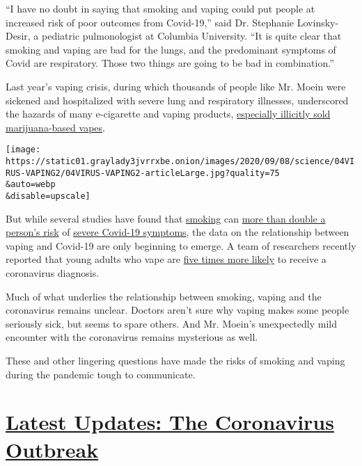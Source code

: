 ``I have no doubt in saying that smoking and vaping could put people at
increased risk of poor outcomes from Covid-19,'' said Dr. Stephanie
Lovinsky-Desir, a pediatric pulmonologist at Columbia University. ``It
is quite clear that smoking and vaping are bad for the lungs, and the
predominant symptoms of Covid are respiratory. Those two things are
going to be bad in combination.''

Last year's vaping crisis, during which thousands of people like Mr.
Moein were sickened and hospitalized with severe lung and respiratory
illnesses, underscored the hazards of many e-cigarette and vaping
products,
\href{https://www.nytimes3xbfgragh.onion/2019/11/08/health/vaping-illness-cdc.html}{especially
illicitly sold marijuana-based vapes}.

\texttt{[image: https://static01.graylady3jvrrxbe.onion/images/2020/09/08/science/04VIRUS-VAPING2/04VIRUS-VAPING2-articleLarge.jpg?quality=75\\\&auto=webp\\\&disable=upscale]}

But while several studies have found that
\href{https://www.nejm.org/doi/full/10.1056/NEJMoa2002032}{smoking} can
\href{https://academic.oup.com/ntr/article/22/9/1653/5835834}{more than
double a person's risk} of
\href{https://www.jahonline.org/article/S1054-139X(20)30338-4/fulltext}{severe
Covid-19 symptoms}, the data on the relationship between vaping and
Covid-19 are only beginning to emerge. A team of researchers recently
reported that young adults who vape are
\href{https://www.sciencedirect.com/science/article/pii/S1054139X20303992}{five
times more likely} to receive a coronavirus diagnosis.

Much of what underlies the relationship between smoking, vaping and the
coronavirus remains unclear. Doctors aren't sure why vaping makes some
people seriously sick, but seems to spare others. And Mr. Moein's
unexpectedly mild encounter with the coronavirus remains mysterious as
well.

These and other lingering questions have made the risks of smoking and
vaping during the pandemic tough to communicate.

\hypertarget{latest-updates-the-coronavirus-outbreak}{%
\section{\texorpdfstring{\href{https://www.nytimes3xbfgragh.onion/2020/09/08/world/covid-19-coronavirus.html?action=click\&pgtype=Article\&state=default\&region=MAIN_CONTENT_1\&context=storylines_live_updates}{Latest
Updates: The Coronavirus
Outbreak}}{Latest Updates: The Coronavirus Outbreak}}\label{latest-updates-the-coronavirus-outbreak}}

